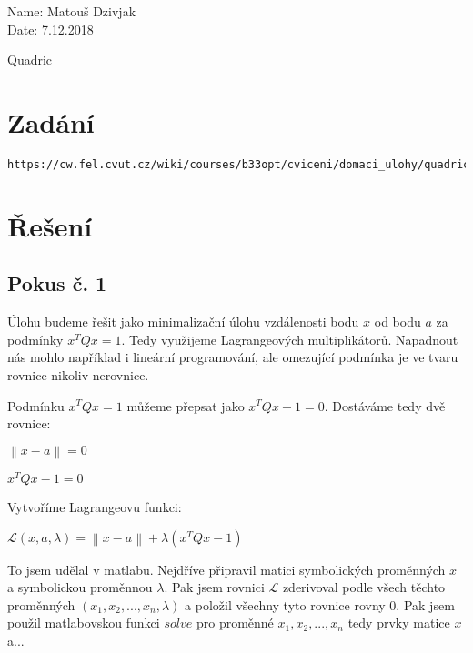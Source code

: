 \documentclass[10pt,a4paper,openright]{article}
\newcommand{\norm}[1]{\left\lVert#1\right\rVert}
\begin{document}
	\begin{flushleft}
		\large Name: Matouš Dzivjak\\
		\large Date: 7.12.2018\\
	\end{flushleft}
\begin{center}
	\huge Quadric
\end{center}
\section{Zadání}
\begin{verbatim}
https://cw.fel.cvut.cz/wiki/courses/b33opt/cviceni/domaci_ulohy/quadric/start
\end{verbatim}


\section{Řešení}

\subsection{Pokus č. 1}
Úlohu budeme řešit jako minimalizační úlohu vzdálenosti bodu $x$ od bodu $a$
za podmínky $x^TQx = 1$. Tedy využijeme Lagrangeových multiplikátorů. Napadnout nás mohlo 
například i lineární programování, ale omezující podmínka je ve tvaru rovnice nikoliv
nerovnice.

Podmínku $x^TQx = 1$ můžeme přepsat jako $x^TQx - 1 = 0$.
Dostáváme tedy dvě rovnice:

\begin{center}
	$\norm{x - a} = 0$

	\vspace{.1cm}

	$x^TQx - 1 = 0$
\end{center}

Vytvoříme Lagrangeovu funkci:

\begin{center}
	$\mathcal{L}(x, a, \lambda) = \norm{x - a} + \lambda (x^TQx - 1)$
\end{center}

To jsem udělal v matlabu. Nejdříve připravil matici symbolických proměnných $x$ 
a symbolickou proměnnou $\lambda$. Pak jsem rovnici $\mathcal{L}$ zderivoval podle
všech těchto proměnných $(x_{1}, x_{2}, ..., x_{n}, \lambda)$ a položil všechny
tyto rovnice rovny 0. Pak jsem použil matlabovskou funkci $solve$ pro proměnné
$x_{1}, x_{2}, ..., x_{n}$ tedy prvky matice $x$ a...
\end{document}
